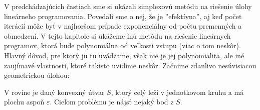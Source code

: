 
\newcommand{\ee}{\ensuremath{\varepsilon}}

V predchádzajúcich častiach sme si ukázali simplexovú metódu na riešenie úlohy lineárneho programovania.
Povedali sme o nej, že je ''efektívna'', aj keď počet iterácií môže byť v najhoršom prípade 
exponenciálny od počtu premenných a obmedzení. V tejto kapitole si ukážeme inú metódu na riešenie
lineárnych programov, ktorá bude polynomiálna od veľkosti vstupu (viac o tom neskôr). Hlavný dôvod,
pre ktorý ju tu uvádzame, však nie je jej polynomialita, ale iné zaujímavé vlastnosti, ktoré takisto
uvidíme neskôr. Začnime zdanlivo nesúvisiacou geometrickou úlohou:

\begin{framed}
  \begin{dfn}
    \label{dfn:2dmember}
    V rovine je daný konvexný útvar $S$, ktorý celý leží v jednotkovom kruhu a má plochu aspoň \ee.
    Cieľom problému \member je nájsť nejaký bod z $S$.
  \end{dfn}
\end{framed}


